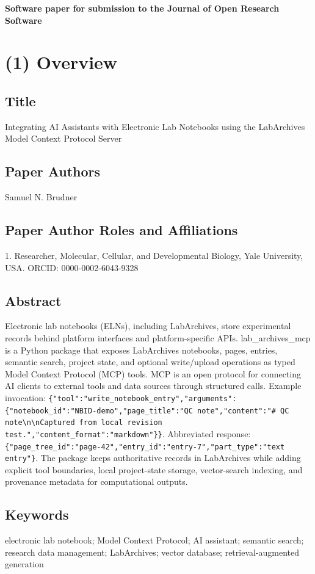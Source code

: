 \documentclass{josr}
\begin{document}
{\bf Software paper for submission to the Journal of Open Research Software} \\

\section*{(1) Overview}

\subsection*{Title}
Integrating AI Assistants with Electronic Lab Notebooks using the LabArchives Model Context Protocol Server

\subsection*{Paper Authors}
Samuel N. Brudner

\subsection*{Paper Author Roles and Affiliations}
1. Researcher, Molecular, Cellular, and Developmental Biology, Yale University, USA. ORCID: 0000-0002-6043-9328

\subsection*{Abstract}
Electronic lab notebooks (ELNs), including LabArchives, store experimental records behind platform interfaces and platform-specific APIs. lab\_archives\_mcp is a Python package that exposes LabArchives notebooks, pages, entries, semantic search, project state, and optional write/upload operations as typed Model Context Protocol (MCP) tools. MCP is an open protocol for connecting AI clients to external tools and data sources through structured calls. Example invocation: \texttt{\{"tool":"write\_notebook\_entry","arguments":\{"notebook\_id":"NBID-demo","page\_title":"QC note","content":"\# QC note\textbackslash{}n\textbackslash{}nCaptured from local revision test.","content\_format":"markdown"\}\}}. Abbreviated response: \texttt{\{"page\_tree\_id":"page-42","entry\_id":"entry-7","part\_type":"text entry"\}}. The package keeps authoritative records in LabArchives while adding explicit tool boundaries, local project-state storage, vector-search indexing, and provenance metadata for computational outputs.

\subsection*{Keywords}
electronic lab notebook; Model Context Protocol; AI assistant; semantic search; research data management; LabArchives; vector database; retrieval-augmented generation
\end{document}
